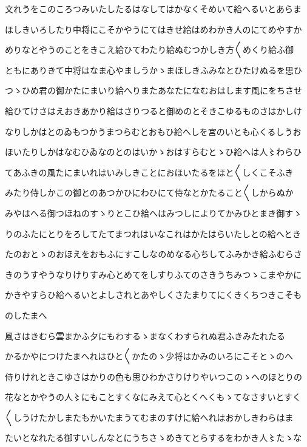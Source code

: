 \documentclass[a4paper,11pt,landscape]{ltjtarticle}
\begin{document}
文れうをこのころつみいたしたるはなしてはかなくそめいて給へるいとあらま
\par\medskip
ほしきいろしたり中将にこそかやうにてはきせ給はめわかき人のにてめやすか
\par\medskip
めりなとやうのことをきこえ給ひてわたり給ぬむつかしき方〱めくり給ふ御
\par\medskip
ともにありきて中将はなま心やましうかゝまほしきふみなとひたけぬるを思ひ
\par\medskip
つゝひめ君の御かたにまいり給へりまたあなたになむおはします風にをちさせ
\par\medskip
給ひてけさはえおきあかり給はさりつると御めのとそきこゆるものさはかしけ
\par\medskip
なりしかはとのゐもつかうまつらむとおもひ給へしを宮のいとも心くるしうお
\par\medskip
ほいたりしかはなむひゐなのとのはいかゝおはすらむとゝひ給へは人〻わらひ
\par\medskip
てあふきの風たにまいれはいみしきことにおほいたるをほと〱しくこそふき
\par\medskip
みたり侍しかこの御とのあつかひにわひにて侍なとかたること〱しからぬか
\par\medskip
みやはへる御つほねのすゝりとこひ給へはみつしによりてかみひとまき御すゝ
\par\medskip
りのふたにとりをろしてたてまつれはいなこれはかたはらいたしとの給へとき
\par\medskip
たのおとゝのおほえをおもふにすこしなのめなる心ちしてふみかき給ふむらさ
\par\medskip
きのうすやうなりけりすみ心とめてをしすりふてのさきうちみつゝこまやかに
\par\medskip
かきやすらひ給へるいとよしされとあやしくさたまりてにくきくちつきこそも
\par\medskip
のしたまへ
\par\medskip
風さはきむら雲まかふ夕にもわするゝまなくわすられぬ君ふきみたれたる
\par\medskip
かるかやにつけたまへれはひと〱かたのゝ少将はかみのいろにこそとゝのへ
\par\medskip
侍りけれときこゆさはかりの色も思ひわかさりけりやいつこのゝへのほとりの
\par\medskip
花なとかやうの人〻にもことすくなにみえて心とくへくもゝてなさすいとすく
\par\medskip
〱しうけたかしまたもかいたまうてむまのすけに給へれはおかしきわらはま
\par\medskip
たいとなれたる御すいしんなとにうちさゝめきてとらするをわかき人〻たゝな
\end{document}
